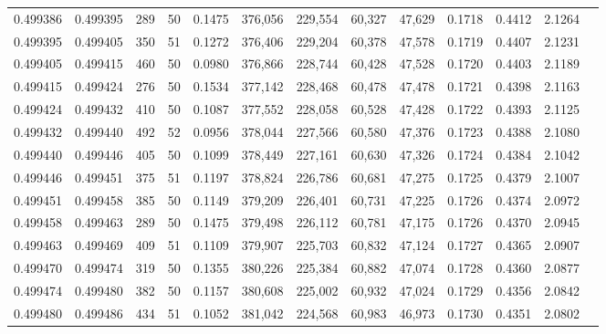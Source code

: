 \begin{tabular}{rrrrrrrrrrrrr}
0.499386 & 0.499395 & 289 &  50 &                                     0.1475 & 376,056 & 229,554 &  60,327 &  47,629 & 0.1718 & 0.4412 & 2.1264 \\
0.499395 & 0.499405 & 350 &  51 &                                     0.1272 & 376,406 & 229,204 &  60,378 &  47,578 & 0.1719 & 0.4407 & 2.1231 \\
0.499405 & 0.499415 & 460 &  50 &                                     0.0980 & 376,866 & 228,744 &  60,428 &  47,528 & 0.1720 & 0.4403 & 2.1189 \\
0.499415 & 0.499424 & 276 &  50 &                                     0.1534 & 377,142 & 228,468 &  60,478 &  47,478 & 0.1721 & 0.4398 & 2.1163 \\
0.499424 & 0.499432 & 410 &  50 &                                     0.1087 & 377,552 & 228,058 &  60,528 &  47,428 & 0.1722 & 0.4393 & 2.1125 \\
0.499432 & 0.499440 & 492 &  52 &                                     0.0956 & 378,044 & 227,566 &  60,580 &  47,376 & 0.1723 & 0.4388 & 2.1080 \\
0.499440 & 0.499446 & 405 &  50 &                                     0.1099 & 378,449 & 227,161 &  60,630 &  47,326 & 0.1724 & 0.4384 & 2.1042 \\
0.499446 & 0.499451 & 375 &  51 &                                     0.1197 & 378,824 & 226,786 &  60,681 &  47,275 & 0.1725 & 0.4379 & 2.1007 \\
0.499451 & 0.499458 & 385 &  50 &                                     0.1149 & 379,209 & 226,401 &  60,731 &  47,225 & 0.1726 & 0.4374 & 2.0972 \\
0.499458 & 0.499463 & 289 &  50 &                                     0.1475 & 379,498 & 226,112 &  60,781 &  47,175 & 0.1726 & 0.4370 & 2.0945 \\
0.499463 & 0.499469 & 409 &  51 &                                     0.1109 & 379,907 & 225,703 &  60,832 &  47,124 & 0.1727 & 0.4365 & 2.0907 \\
0.499470 & 0.499474 & 319 &  50 &                                     0.1355 & 380,226 & 225,384 &  60,882 &  47,074 & 0.1728 & 0.4360 & 2.0877 \\
0.499474 & 0.499480 & 382 &  50 &                                     0.1157 & 380,608 & 225,002 &  60,932 &  47,024 & 0.1729 & 0.4356 & 2.0842 \\
0.499480 & 0.499486 & 434 &  51 &                                     0.1052 & 381,042 & 224,568 &  60,983 &  46,973 & 0.1730 & 0.4351 & 2.0802 \\

\end{tabular}
